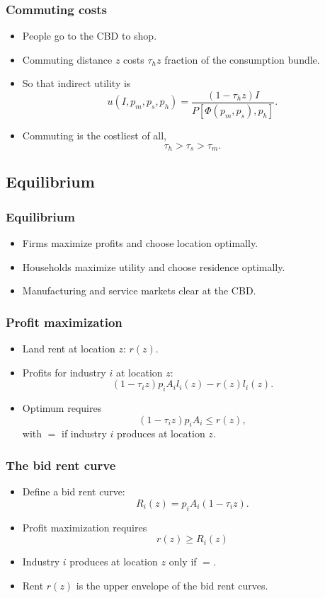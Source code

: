 \documentclass[handout,compress,mathserif]{beamer}
\begin{document}
\begin{frame}\frametitle{Commuting costs}
\begin{itemize}
    \item People go to the CBD to shop.
    \item Commuting distance $z$ costs $\tau_h z$ fraction of the consumption bundle.
    \item So that indirect utility is
    \[
    u(I,p_m,p_s,p_h) = \frac{(1-\tau_h z)I}{P[\Phi(p_m,p_s),p_h]}.
    \]
    \item Commuting is the costliest of all,
    \[
    \tau_h>\tau_s>\tau_m.
    \]
\end{itemize}
\end{frame}

\subsection{Equilibrium}

\begin{frame}\frametitle{Equilibrium}
\begin{itemize}
    \item Firms maximize profits and choose location optimally.
    \item Households maximize utility and choose residence optimally.
    \item Manufacturing and service markets clear at the CBD.
\end{itemize}
\end{frame}

\begin{frame}\frametitle{Profit maximization}
\begin{itemize}
    \item Land rent at location $z$: $r(z)$.
    \item Profits for industry $i$ at location $z$:
    \[
    (1-\tau_i z) p_i A_i l_i(z) - r(z)l_i(z).
    \]
    \item Optimum requires
    \[
    (1-\tau_i z) p_i A_i \le r(z),
    \]
    with $=$ if industry $i$ produces at location $z$.
\end{itemize}
\end{frame}

\begin{frame}\frametitle{The bid rent curve}
\begin{itemize}
    \item Define a bid rent curve:
    \[
    R_i(z) = p_iA_i(1-\tau_i z).
    \]
    \item Profit maximization requires
    \[
    r(z)\ge R_i(z)
    \]
    \item Industry $i$ produces at location $z$ only if $=$.
    \item Rent $r(z)$ is the upper envelope of the bid rent curves.
\end{itemize}
\end{frame}
\end{document}
